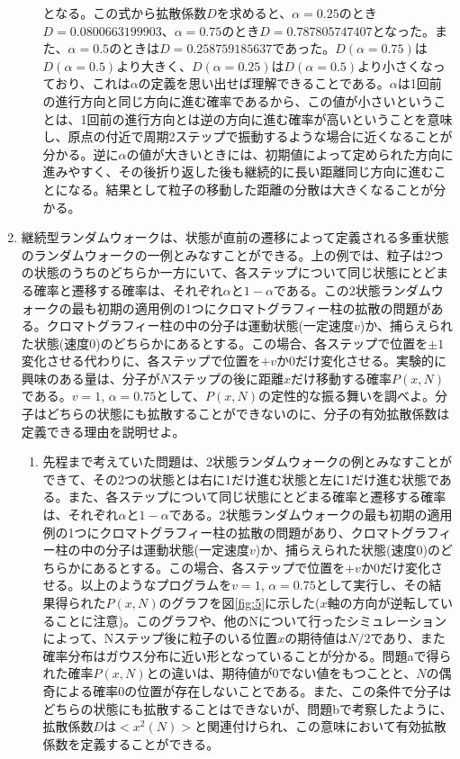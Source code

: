 \documentclass{jsarticle}
\begin{document}
\begin{enumerate}
\begin{enumerate}
                となる。この式から拡散係数$D$を求めると、$\alpha =0.25$のとき$D=0.0800663199903$、$\alpha =0.75$のとき$D =  0.787805747407$となった。また、$\alpha=0.5$のときは$D=0.258759185637$であった。$D(\alpha = 0.75)$は$D(\alpha = 0.5)$より大きく、$D(\alpha = 0.25)$は$D(\alpha = 0.5)$より小さくなっており、これは$\alpha$の定義を思い出せば理解できることである。$\alpha$は1回前の進行方向と同じ方向に進む確率であるから、この値が小さいということは、1回前の進行方向とは逆の方向に進む確率が高いということを意味し、原点の付近で周期2ステップで振動するような場合に近くなることが分かる。逆に$\alpha$の値が大きいときには、初期値によって定められた方向に進みやすく、その後折り返した後も継続的に長い距離同じ方向に進むことになる。結果として粒子の移動した距離の分散は大きくなることが分かる。
                 
                \end{enumerate} 
                
            \item 継続型ランダムウォークは、状態が直前の遷移によって定義される多重状態のランダムウォークの一例とみなすことができる。上の例では、粒子は2つの状態のうちのどちらか一方にいて、各ステップについて同じ状態にとどまる確率と遷移する確率は、それぞれ$\alpha$と$1-\alpha$である。この2状態ランダムウォークの最も初期の適用例の1つにクロマトグラフィー柱の拡散の問題がある。クロマトグラフィー柱の中の分子は運動状態(一定速度$v$)か、捕らえられた状態(速度0)のどちらかにあるとする。この場合、各ステップで位置を$\pm 1$変化させる代わりに、各ステップで位置を$+v$か$0$だけ変化させる。実験的に興味のある量は、分子が$N$ステップの後に距離$x$だけ移動する確率$P(x,N)$である。$v = 1$, $\alpha = 0.75$として、$P(x,N)$の定性的な振る舞いを調べよ。分子はどちらの状態にも拡散することができないのに、分子の有効拡散係数は定義できる理由を説明せよ。
            
                \begin{enumerate}
                    \item 先程まで考えていた問題は、2状態ランダムウォークの例とみなすことができて、その2つの状態とは右に1だけ進む状態と左に1だけ進む状態である。また、各ステップについて同じ状態にとどまる確率と遷移する確率は、それぞれ$\alpha$と$1-\alpha$である。2状態ランダムウォークの最も初期の適用例の1つにクロマトグラフィー柱の拡散の問題があり、クロマトグラフィー柱の中の分子は運動状態(一定速度$v$)か、捕らえられた状態(速度0)のどちらかにあるとする。この場合、各ステップで位置を$+v$か$0$だけ変化させる。以上のようなプログラムを$v = 1$, $\alpha = 0.75$として実行し、その結果得られた$P(x,N)$のグラフを図\ref{fig:5}に示した($x$軸の方向が逆転していることに注意)。このグラフや、他のNについて行ったシミュレーションによって、Nステップ後に粒子のいる位置$x$の期待値は$N/2$であり、また確率分布はガウス分布に近い形となっていることが分かる。問題aで得られた確率$P(x,N)$との違いは、期待値が0でない値をもつことと、$N$の偶奇による確率0の位置が存在しないことである。また、この条件で分子はどちらの状態にも拡散することはできないが、問題bで考察したように、拡散係数$D$は$<x^{2}(N)>$と関連付けられ、この意味において有効拡散係数を定義することができる。
                    

\end{enumerate}
\end{enumerate}
\end{document}
